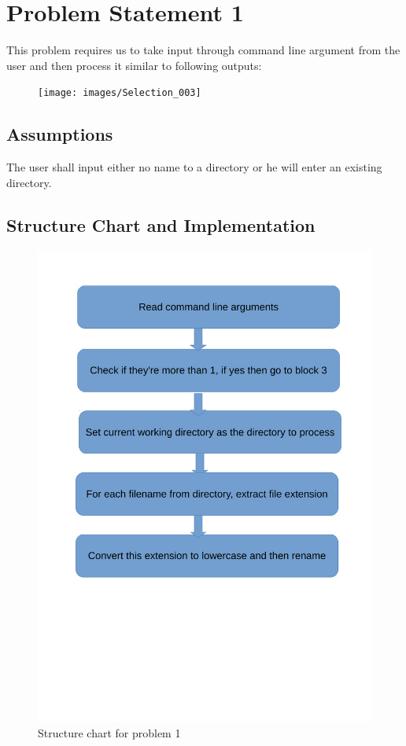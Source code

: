 \documentclass[11pt]{report}
\begin{document}
\section{Problem Statement 1}
	This problem requires us to take input through command line argument from the user and then process it similar to following outputs:\\
	\begin{figure}[h!]
	\centering
	\texttt{[image: images/Selection\_003]}	
	\end{figure}
	\subsection{Assumptions}
	The user shall input either no name to a directory or he will enter an existing directory.
	\pagebreak
	\subsection{Structure Chart and Implementation}
	\begin{figure}[h!]
	\centering
	\includegraphics[scale=0.7]{images/shots11}
	\caption{Structure chart for problem 1}
	\end{figure}		
	\pagebreak
\end{document}
